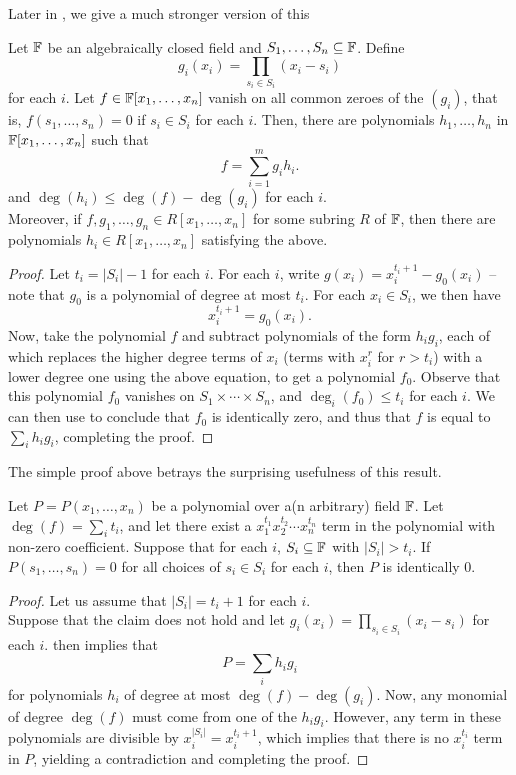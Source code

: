 	Later in , we give a much stronger version of this

	\begin{ftheo}
		\label{thm: comb null}
		Let $\mathbb{F}$ be an algebraically closed field and $S_1,\ldots,S_n \subseteq \mathbb{F}$. Define
		\[ g_i(x_i) = \prod_{s_i \in S_i} (x_i - s_i) \]
		for each $i$. Let $f \in \mathbb{F}[x_1,\ldots,x_n]$ vanish on all common zeroes of the $(g_i)$, that is, $f(s_1,\ldots,s_n) = 0$ if $s_i \in S_i$ for each $i$. Then, there are polynomials $h_1,\ldots,h_n$ in $\mathbb{F}[x_1,\ldots,x_n]$ such that
		\[ f = \sum_{i=1}^{m} g_i h_i. \]
		and $\deg(h_i) \le \deg(f) - \deg(g_i)$ for each $i$.\\
		Moreover, if $f,g_1,\ldots,g_n \in R[x_1,\ldots,x_n]$ for some subring $R$ of $\mathbb{F}$, then there are polynomials $h_i \in R[x_1,\ldots,x_n]$ satisfying the above.
	\end{ftheo}
	\begin{proof}
		Let $t_i = |S_i| - 1$ for each $i$. For each $i$, write $g(x_i) = x_i^{t_i+1} - g_0(x_i)$ -- note that $g_0$ is a polynomial of degree at most $t_i$. For each $x_i \in S_i$, we then have
		\[ x_i^{t_i + 1} = g_0(x_i). \]
		Now, take the polynomial $f$ and subtract polynomials of the form $h_i g_i$, each of which replaces the higher degree terms of $x_i$ (terms with $x_i^{r}$ for $r > t_i$) with a lower degree one using the above equation, to get a polynomial $f_0$. Observe that this polynomial $f_0$ vanishes on $S_1 \times \cdots \times S_n$, and $\deg_i(f_0) \le t_i$ for each $i$. We can then use  to conclude that $f_0$ is identically zero, and thus that $f$ is equal to $\sum_i h_i g_i$, completing the proof.
	\end{proof}

	The simple proof above betrays the surprising usefulness of this result.

	\begin{fcor}
		\label{thm: cube-vanishing}
		Let $P = P(x_1,\ldots,x_n)$ be a polynomial over a(n arbitrary) field $\mathbb{F}$. Let $\deg(f) = \sum_i t_i$, and let there exist a $x_1^{t_1} x_2^{t_2} \cdots x_n^{t_n}$ term in the polynomial with non-zero coefficient. Suppose that for each $i$, $S_i \subseteq \mathbb{F}$ with $|S_i| > t_i$. If $P(s_1,\ldots,s_n) = 0$ for all choices of $s_i \in S_i$ for each $i$, then $P$ is identically $0$. 
	\end{fcor}
	\begin{proof}
		Let us assume that $|S_i| = t_i + 1$ for each $i$.\\
		Suppose that the claim does not hold and let $g_i(x_i) = \prod_{s_i \in S_i} (x_i - s_i)$ for each $i$.  then implies that
		\[ P = \sum_i h_i g_i \]
		for polynomials $h_i$ of degree at most $\deg(f) - \deg(g_i)$. Now, any monomial of degree $\deg(f)$ must come from one of the $h_i g_i$. However, any term in these polynomials are divisible by $x_i^{|S_i|} = x_i^{t_i + 1}$, which implies that there is no $x_i^{t_i}$ term in $P$, yielding a contradiction and completing the proof.
	\end{proof}

